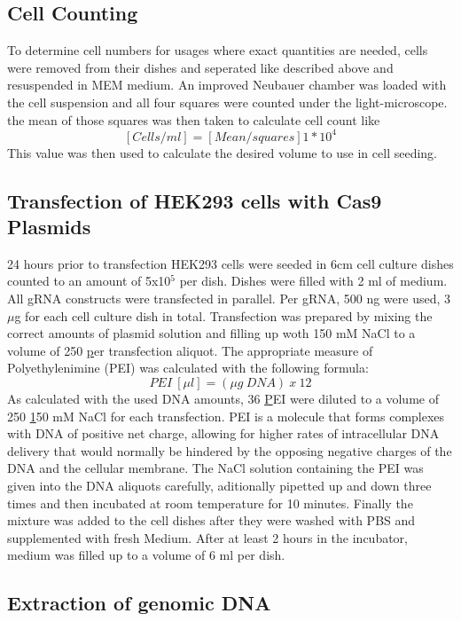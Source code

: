 \subsection{Cell Counting}
\label{cell counting}

To determine cell numbers for usages where exact quantities are needed, cells were removed from their dishes and seperated like described above and resuspended in MEM medium. An improved Neubauer chamber was loaded with the cell suspension and all four squares were counted under the light-microscope. the mean of those squares was then taken to calculate cell count like \[[Cells/ml] = [Mean/squares]  1 * 10^4\] This value was then used to calculate the desired volume to use in cell seeding.

\subsection{Transfection of HEK293 cells with Cas9 Plasmids}

24 hours prior to transfection HEK293 cells were seeded in 6cm cell culture dishes counted to an amount of 5x10\(^5\) per dish. Dishes were filled with 2 ml of medium. All gRNA constructs were transfected in parallel. Per gRNA, 500 ng were used, 3 \(\mu\)g for each cell culture dish in total. Transfection was prepared by mixing the correct amounts of plasmid solution and filling up woth 150 mM NaCl to a volume of 250 \ul per transfection aliquot. The appropriate measure of Polyethylenimine (PEI) was calculated with the following formula: \[PEI \ [\mu l] = (\mu g \ DNA) \ x \ 12\]
As calculated with the used DNA amounts, 36 \ul PEI were diluted to a volume of 250 \ul 150 mM NaCl for each transfection. PEI is a molecule that forms complexes with DNA of positive net charge, allowing for higher rates of intracellular DNA delivery that would normally be hindered by the opposing negative charges of the DNA and the cellular membrane. The NaCl solution containing the PEI was given into the DNA aliquots carefully, aditionally pipetted up and down three times and then incubated at room temperature for 10 minutes. Finally the mixture was added to the cell dishes after they were washed with PBS and supplemented with fresh Medium. After at least 2 hours in the incubator, medium was filled up to a volume of 6 ml per dish.

\subsection{Extraction of genomic DNA}

